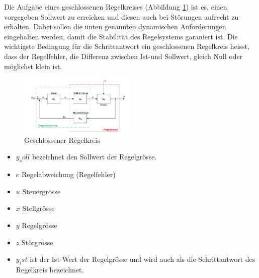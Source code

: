 Die    Aufgabe   eines    geschlossenen    Regelkreises (Abbildung \ref{fig:geschlossenerRegelkreis}) ist  es, einen  vorgegeben Sollwert  zu erreichen  und diesen
auch bei  St\"orungen aufrecht zu  erhalten. Dabei sollen die  unten genannten
dynamischen  Anforderungen  eingehalten  werden, damit  die  Stabilit\"at  des
Regelsystems garaniert ist. Die wichtigste  Bedingung f\"ur die Schrittantwort
ein  geschlossenen  Regelkreis heisst,  dass  der  Regelfehler, die  Differenz
zwischen Ist-und Sollwert, gleich Null oder m\"oglichst klein ist.\\


\begin{figure}[!h!, width=\pagewidth]
\begin{center}
    \includegraphics[width=0.5\textwidth]{images/geschlRegelkreis}
    \caption{Geschlossener Regelkreis}
    \label{fig:geschlossenerRegelkreis}
\end{center}
\end{figure}

\begin{itemize}
    \item
        $y_soll$ bezeichnet den Sollwert der Regelgr\"osse.
    \item
        $e$ Regelabweichung (Regelfehler)
    \item
        $u$ Steuergr\"osse
    \item
        $x$ Stellgr\"osse
    \item
        $y$ Regelgr\"osse
    \item
        $z$ St\"orgr\"osse
    \item
        $y_ist$  ist der  Ist-Wert der  Regelgr\"osse  und wird  auch als  die
        Schrittantwort des Regelkreis bezeichnet.
\end{itemize}


